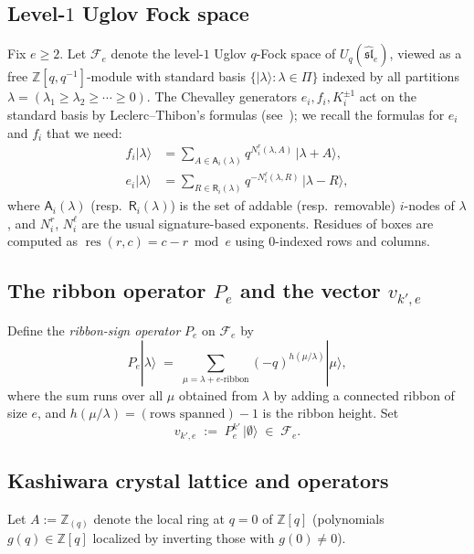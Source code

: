 \documentclass[11pt]{article}
\theoremstyle{definition}
\newcommand{\Fock}{\mathcal{F}}
\newcommand{\Uq}{U_q(\widehat{\mathfrak{sl}}_e)}
\newcommand{\vke}{v_{k',e}}
\newcommand{\ZZ}{\mathbb{Z}}
\newcommand{\Aa}{{\mathsf A}}
\newcommand{\Rr}{{\mathsf R}}
\begin{document}
\subsection{Level-$1$ Uglov Fock space}

Fix $e \ge 2$. Let $\Fock_e$ denote the level-$1$ Uglov $q$-Fock space of
$\Uq$, viewed as a free $\ZZ[q, q^{-1}]$-module with standard basis
$\{|\lambda\rangle : \lambda \in \Pi\}$ indexed by all partitions
$\lambda = (\lambda_1 \ge \lambda_2 \ge \cdots \ge 0)$. The Chevalley
generators $e_i, f_i, K_i^{\pm 1}$ act on the standard basis by
Leclerc--Thibon's formulas (see~\cite{LT1996, Uglov2000}); we recall the
formulas for $e_i$ and $f_i$ that we need:
\begin{align*}
  f_i |\lambda\rangle
    &= \sum_{A \in \Aa_i(\lambda)} q^{N_i^r(\lambda, A)} \,|\lambda + A\rangle, \\
  e_i |\lambda\rangle
    &= \sum_{R \in \Rr_i(\lambda)} q^{-N_i^\ell(\lambda, R)} \,|\lambda - R\rangle,
\end{align*}
where $\Aa_i(\lambda)$ (resp.\ $\Rr_i(\lambda)$) is the set of addable
(resp.\ removable) $i$-nodes of $\lambda$, and $N_i^r$, $N_i^\ell$ are the
usual signature-based exponents. Residues of boxes are computed as
$\operatorname{res}(r, c) = c - r \bmod e$ using $0$-indexed rows and
columns.

\subsection{The ribbon operator $P_e$ and the vector $\vke$}

Define the \emph{ribbon-sign operator} $P_e$ on $\Fock_e$ by
\[
  P_e |\lambda\rangle \;=\; \sum_{\mu = \lambda + e\text{-ribbon}}
  (-q)^{h(\mu/\lambda)} |\mu\rangle,
\]
where the sum runs over all $\mu$ obtained from $\lambda$ by adding a
connected ribbon of size $e$, and $h(\mu/\lambda) = (\text{rows spanned}) - 1$
is the ribbon height. Set
\[
  \vke \;:=\; P_e^{k'} \,|\emptyset\rangle \;\in\; \Fock_e.
\]

\subsection{Kashiwara crystal lattice and operators}

Let $A := \ZZ_{(q)}$ denote the local ring at $q = 0$ of $\ZZ[q]$
(polynomials $g(q) \in \ZZ[q]$ localized by inverting those with
$g(0) \ne 0$).
\end{document}
